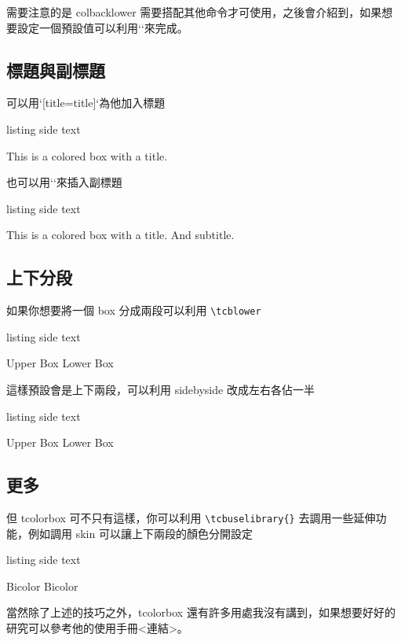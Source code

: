 需要注意的是 colbacklower 需要搭配其他命令才可使用，之後會介紹到，如果想要設定一個預設值可以利用`\tcbset{}`來完成。

\subsection{標題與副標題}

可以用`[title=title]`為他加入標題

\begin{tcblisting}{listing side text}
\begin{tcolorbox}[title=Title]
This is a colored box with a title.
\end{tcolorbox}
\end{tcblisting}

也可以用``來插入副標題

\begin{tcblisting}{listing side text}
\begin{tcolorbox}[title=Title]
This is a colored box with a title.
And subtitle.
\end{tcolorbox}
\end{tcblisting}

\subsection{上下分段}

如果你想要將一個 box 分成兩段可以利用 \verb`\tcblower`

\begin{tcblisting}{listing side text}
\begin{tcolorbox}
Upper Box
\tcblower
Lower Box
\end{tcolorbox}
\end{tcblisting}

這樣預設會是上下兩段，可以利用 sidebyside 改成左右各佔一半

\begin{tcblisting}{listing side text}
\begin{tcolorbox}[sidebyside]
Upper Box
\tcblower
Lower Box
\end{tcolorbox}
\end{tcblisting}

\subsection{更多}

但 tcolorbox 可不只有這樣，你可以利用 \verb`\tcbuselibrary{}` 去調用一些延伸功能，例如調用 skin 可以讓上下兩段的顏色分開設定

\begin{tcblisting}{listing side text}
\begin{tcolorbox}[skin=bicolor, sidebyside, colback=gray!30!white,colbacklower=gray!5!white]
Bicolor
\tcblower
Bicolor
\end{tcolorbox}
\end{tcblisting}

當然除了上述的技巧之外，tcolorbox 還有許多用處我沒有講到，如果想要好好的研究可以參考他的使用手冊<連結>。